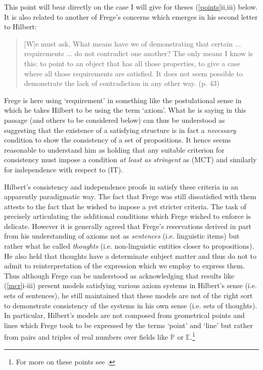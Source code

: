 \documentclass[11pt,fleqn,leqno]{article}
\begin{document}
This point will bear directly on the case I will give for theses (\ref{points}ii,iii) below.  It is also related to another of Frege's concerns which emerges in his second letter to Hilbert: 

{\footnotesize 
\begin{quote}
[W]e must ask, What means have we of demonstrating that certain $\ldots$ requirements $\ldots$ do not contradict one another? The only means I know is this: to point to an object that has all those properties, to give a case where all those requirements are satisfied. It does not seem possible to demonstrate the lack of contradiction in any other way. \hfill (p. 43)
\end{quote}
}
\noindent Frege is here using `requirement'  in something like the postulational sense in which he takes Hilbert to be using the term `axiom'.  What he is saying in this passage  (and others to be considered below) can thus be understood as suggesting that the existence of a satisfying structure is in fact a \textsl{necessary} condition to show the consistency of a set of propositions.  It hence seems reasonable to understand him as holding that any suitable criterion for consistency must impose a condition \textsl{at least as stringent} as (MCT) and similarly for independence with respect to (IT).

Hilbert's consistency and independence proofs in \citeyearpar{Hilbert1899} satisfy these criteria in an apparently paradigmatic way.   The fact that Frege was still dissatisfied with them attests to the fact that he wished to impose a yet stricter criteria.   The task of precisely articulating the additional conditions which Frege wished to enforce is delicate.  However it is generally agreed that Frege's reservations derived in part from his understanding of axioms not as \textsl{sentences} (i.e. linguistic items) but rather what he called \textsl{thoughts} (i.e. non-linguistic entities closer to propositions).  He also held that thoughts have a determinate subject matter and thus do not to admit to reinterpretation of the expression which we employ to express them.  Thus although Frege can be understood as acknowledging that results like (\ref{mcr}i-iii) present models satisfying various axiom systems in Hilbert's sense (i.e. sets of sentences), he still maintained that these models are not of the right sort to demonstrate consistency of the systems in his own sense (i.e. sets of thoughts).  In particular, Hilbert's models are not composed from geometrical points and lines which Frege took to be expressed by the terms `point' and `line'  but rather from pairs and triples of real numbers over fields like $\mathbb{P}$ or $\mathbb{E}$.\footnote{For more on these points see \citep{Blanchette1996,Blanchette2012}.}
\end{document}
